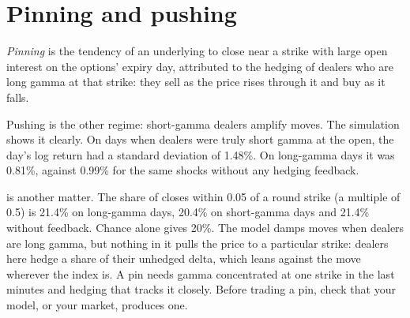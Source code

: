 \begin{omfigure}

\label{fig:s2:zero-day-options-and-dealer-gamma-flows:estimate}
\end{omfigure}

\section{Pinning and pushing}

\begin{definition}[Pinning]\label{def:s2:zero-day-options-and-dealer-gamma-flows:pinning}
\emph{Pinning} is the tendency of an underlying to close near a strike with large open interest on the options' expiry day, attributed
to the hedging of dealers who are long gamma at that strike: they sell as the price rises through it and buy as it falls.
\end{definition}

Pushing is the other regime: short-gamma dealers amplify moves. The simulation shows it clearly. On days when dealers were truly short gamma at the
open, the day's log return had a standard deviation of 1.48\%. On long-gamma days it was 0.81\%, against 0.99\% for the same shocks without any
hedging feedback.

 is another matter. The share of closes within 0.05 of a round strike (a multiple of 0.5) is 21.4\% on long-gamma days, 20.4\% on short-gamma
days and 21.4\% without feedback. Chance alone gives 20\%. The model damps moves when dealers are long gamma, but nothing in it pulls the price to a
particular strike: dealers here hedge a share of their unhedged delta, which leans against the move wherever the index is. A pin needs gamma
concentrated at one strike in the last minutes and hedging that tracks it closely. Before trading a pin, check that your model, or your market,
produces one.

